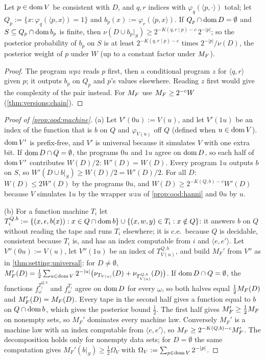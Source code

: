 \begin{proposition}\label{prop:ood:relative}
Let $p\in\operatorname{dom} V$ be consistent with $D$, and $q,r$ indices with $\varphi_q(\langle p,\cdot\rangle)$ total; let $Q_p:=\{x:\varphi_q(\langle p,x\rangle)=1\}$ and $b_p(x):=\varphi_r(\langle p,x\rangle)$. If $Q_p\cap\operatorname{dom} D=\emptyset$ and $S\subseteq Q_p\cap\operatorname{dom} b_p$ is finite, then $\nu(D\cup b_p|_S)\ge2^{-K(q,r\mid p)-c}\,2^{-|p|}$; so the posterior probability of $b_p$ on $S$ is at least $2^{-K(q,r\mid p)-c}$ times $2^{-|p|}/\nu(D)$, the posterior weight of $p$ under $W$ (up to a constant factor under $M_{F}$).
\end{proposition}

\begin{proof}
The program $wpz$ reads $p$ first, then a conditional program $z$ for $\langle q,r\rangle$ given $p$; it outputs $b_p$ on $Q_p$ and $p$'s values elsewhere. Reading $z$ first would give the complexity of the pair instead. For $M_{F}$ use $M_{F}\ge2^{-c}W$ (\cref{thm:versions:chain}).
\end{proof}

\begin{proof}[Proof of \cref{prop:ood:machine}]
(a) Let $V'(0u):=V(u)$, and let $V'(1u)$ be an index of the function that is $b$ on $Q$ and $\varphi_{V(u)}$ off $Q$ (defined when $u\in\operatorname{dom} V$). $\operatorname{dom} V'$ is prefix-free, and $V'$ is universal because it simulates $V$ with one extra bit. If $\operatorname{dom} D\cap Q=\emptyset$, the programs $0u$ and $1u$ agree on $\operatorname{dom} D$, so each half of $\operatorname{dom} V'$ contributes $W(D)/2$: $W'(D)=W(D)$. Every program $1u$ outputs $b$ on $S$, so $W'(D\cup b|_S)\ge W(D)/2=W'(D)/2$. For all $D$: $W(D)\le2W'(D)$ by the programs $0u$, and $W(D)\ge2^{-K(Q,b)-c}W'(D)$ because $V$ simulates $1u$ by the wrapper $wzu$ of \cref{prop:ood:hanni} and $0u$ by $u$.

(b) For a function machine $T_i$ let $T_i^{Q,b}:=\{(x,\epsilon,b(x)):x\in Q\cap\operatorname{dom} b\}\cup\{(x,w,y)\in T_i:x\notin Q\}$: it answers $b$ on $Q$ without reading the tape and runs $T_i$ elsewhere; it is c.e.\ because $Q$ is decidable, consistent because $T_i$ is, and has an index computable from $i$ and $\langle e,e'\rangle$. Let $V''(0u):=V(u)$, let $V''(1u)$ be an index of $T^{Q,b}_{V(u)}$, and build $M_F'$ from $V''$ as in \cref{thm:setting:universal}: for $D\ne\emptyset$, $M_F'(D)=\frac12\sum_{u\in\operatorname{dom} V}2^{-|u|}\big(\nu_{T_{V(u)}}(D)+\nu_{T^{Q,b}_{V(u)}}(D)\big)$. If $\operatorname{dom} D\cap Q=\emptyset$, the functions $f^{T_i^{Q,b}}_\omega$ and $f^{T_i}_\omega$ agree on $\operatorname{dom} D$ for every $\omega$, so both halves equal $\frac12M_{F}(D)$ and $M_F'(D)=M_{F}(D)$. Every tape in the second half gives a function equal to $b$ on $Q\cap\operatorname{dom} b$, which gives the posterior bound $\frac12$. The first half gives $M_F'\ge\frac12M_{F}$ on nonempty sets, so $M_F'$ dominates every machine law. Conversely $M_F'$ is a machine law with an index computable from $\langle e,e'\rangle$, so $M_{F}\ge2^{-K(Q,b)-c}M_F'$. The decomposition holds only for nonempty data sets; for $D=\emptyset$ the same computation gives $M_F'(b|_S)\ge\frac12\Omega_V$ with $\Omega_V:=\sum_{p\in\operatorname{dom} V}2^{-|p|}$.
\end{proof}

